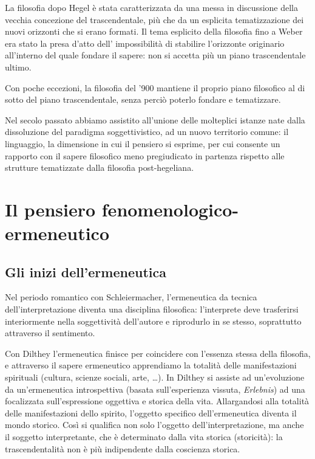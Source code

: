 La filosofia dopo Hegel è stata caratterizzata
da una messa in discussione della vecchia concezio­ne del trascendentale, più che da un esplicita
tematizzazione dei nuovi orizzonti che si erano
formati. Il tema esplicito della filosofia
fino a Weber era stato la presa d'atto dell'
impossibilità di stabilire l'orizzonte originario
all'interno del quale fondare il sapere: non si
accetta più un piano trascendentale ultimo.

Con poche eccezioni, la filosofia del '900
mantiene il proprio piano filosofico al di sotto
del piano trascendentale, senza perciò poterlo
fondare e tematizzare.

Nel secolo passato abbiamo assistito all'unione
delle molteplici istanze nate dalla dissoluzione
del paradigma soggettivistico, ad un nuovo
territorio comune: il linguaggio, la dimensione
in cui il pensiero si esprime, per cui consente
un rapporto con il sapere filosofico meno pregiudicato in partenza rispetto alle strutture tematizzate dalla filosofia post-hegeliana.

\chapter{Il pensiero fenomenologico-ermeneutico}
\bigskip
\bigskip
\section{Gli inizi dell'ermeneutica}

Nel periodo romantico con Schleiermacher,
l'ermeneutica da tecnica dell'interpretazione diventa  una disciplina filosofica: l'interprete deve
trasferirsi interiormente nella soggettività dell'autore e riprodurlo in se stesso, soprattutto
attraverso il sentimento.

Con Dilthey l'ermeneutica finisce per coincidere
con l'essenza stessa della filosofia, e attraverso
il sapere ermeneutico apprendiamo la totalità delle
manifestazioni spirituali (cultura, scienze sociali, arte, \dots).
In Dilthey si assiste ad un'evoluzione da un'ermeneutica introspettiva (basata sull'esperienza
vissuta, \textit{Erlebnis}) ad una focalizzata sull'espressione oggettiva e storica della vita.
Allargandosi alla totalità delle manifestazioni
dello spirito, l'oggetto specifico dell'ermeneutica
diventa il mondo storico.
Così si qualifica non solo l'oggetto dell'interpretazione,
ma anche il soggetto interpretante, che è determinato dalla vita storica (storicità): la trascendentalità non è più indipendente dalla coscienza
storica.


